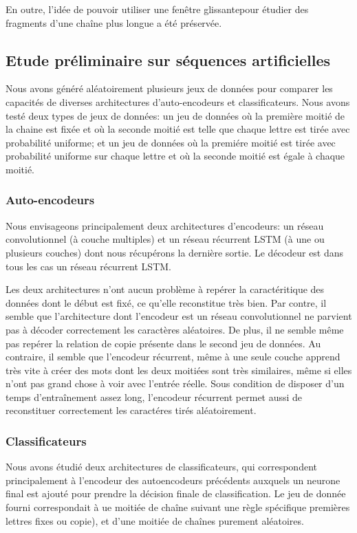 \documentclass[a4paper, journal, 11pt, onecolumn]{IEEEtran}
\begin{document}
En outre, l'idée de pouvoir utiliser une \og fenêtre glissante\fg pour étudier
des fragments d'une chaîne plus longue a été préservée.

\subsection{Etude préliminaire sur séquences artificielles}

Nous avons généré aléatoirement plusieurs jeux de données pour comparer les
capacités de diverses architectures d'auto-encodeurs et classificateurs. Nous
avons testé deux types de jeux de données: un jeu de données où la première
moitié de la chaine est fixée et où la seconde moitié est telle que chaque
lettre est tirée avec probabilité uniforme; et un jeu de données où la premiére
moitié est tirée avec probabilité uniforme sur chaque lettre et où la seconde
moitié est égale à chaque moitié.

\subsubsection{Auto-encodeurs}

Nous envisageons principalement deux architectures d'encodeurs: un réseau
convolutionnel (à couche multiples) et un réseau récurrent LSTM (à une ou plusieurs
couches) dont nous récupérons la dernière sortie. Le décodeur est dans tous les
cas un réseau récurrent LSTM.

Les deux architectures n'ont aucun problème à repérer la caractéritique des données dont le
début est fixé, ce qu'elle reconstitue très bien. Par contre, il semble que l'architecture dont l'encodeur est un
réseau convolutionnel ne parvient pas à décoder correctement les caractères
aléatoires. De plus, il ne semble même pas repérer la relation de \og copie\fg
présente dans le second jeu de données. Au contraire, il semble que l'encodeur
récurrent, même à une seule couche apprend très vite à créer des mots dont les
deux moitiées sont très similaires, même si elles n'ont pas grand chose à voir
avec l'entrée réelle. Sous condition de disposer d'un temps d'entraînement assez
long, l'encodeur récurrent permet aussi de reconstituer correctement les
caractéres tirés aléatoirement.

\subsubsection{Classificateurs}

Nous avons étudié deux architectures de classificateurs, qui correspondent
principalement à l'encodeur des autoencodeurs précédents auxquels un neurone
final est ajouté pour prendre la décision finale de classification. Le jeu de
donnée fourni correspondait à ue moitiée de chaîne suivant une règle spécifique
premières lettres fixes ou copie), et d'une moitiée de chaînes purement aléatoires.
\end{document}
